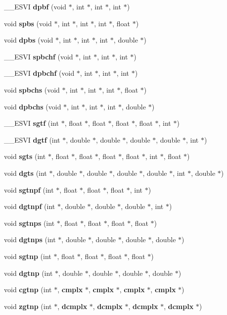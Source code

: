 \begin{CompactItemize}
\item 
\_\-\_\-ESVI {\bf dpbf} (void $\ast$, int $\ast$, int $\ast$, int $\ast$)
\item 
void {\bf spbs} (void $\ast$, int $\ast$, int $\ast$, int $\ast$, float $\ast$)
\item 
void {\bf dpbs} (void $\ast$, int $\ast$, int $\ast$, int $\ast$, double $\ast$)
\item 
\_\-\_\-ESVI {\bf spbchf} (void $\ast$, int $\ast$, int $\ast$, int $\ast$)
\item 
\_\-\_\-ESVI {\bf dpbchf} (void $\ast$, int $\ast$, int $\ast$, int $\ast$)
\item 
void {\bf spbchs} (void $\ast$, int $\ast$, int $\ast$, int $\ast$, float $\ast$)
\item 
void {\bf dpbchs} (void $\ast$, int $\ast$, int $\ast$, int $\ast$, double $\ast$)
\item 
\_\-\_\-ESVI {\bf sgtf} (int $\ast$, float $\ast$, float $\ast$, float $\ast$, float $\ast$, int $\ast$)
\item 
\_\-\_\-ESVI {\bf dgtf} (int $\ast$, double $\ast$, double $\ast$, double $\ast$, double $\ast$, int $\ast$)
\item 
void {\bf sgts} (int $\ast$, float $\ast$, float $\ast$, float $\ast$, float $\ast$, int $\ast$, float $\ast$)
\item 
void {\bf dgts} (int $\ast$, double $\ast$, double $\ast$, double $\ast$, double $\ast$, int $\ast$, double $\ast$)
\item 
void {\bf sgtnpf} (int $\ast$, float $\ast$, float $\ast$, float $\ast$, int $\ast$)
\item 
void {\bf dgtnpf} (int $\ast$, double $\ast$, double $\ast$, double $\ast$, int $\ast$)
\item 
void {\bf sgtnps} (int $\ast$, float $\ast$, float $\ast$, float $\ast$, float $\ast$)
\item 
void {\bf dgtnps} (int $\ast$, double $\ast$, double $\ast$, double $\ast$, double $\ast$)
\item 
void {\bf sgtnp} (int $\ast$, float $\ast$, float $\ast$, float $\ast$, float $\ast$)
\item 
void {\bf dgtnp} (int $\ast$, double $\ast$, double $\ast$, double $\ast$, double $\ast$)
\item 
void {\bf cgtnp} (int $\ast$, {\bf cmplx} $\ast$, {\bf cmplx} $\ast$, {\bf cmplx} $\ast$, {\bf cmplx} $\ast$)
\item 
void {\bf zgtnp} (int $\ast$, {\bf dcmplx} $\ast$, {\bf dcmplx} $\ast$, {\bf dcmplx} $\ast$, {\bf dcmplx} $\ast$)

\end{CompactItemize}
